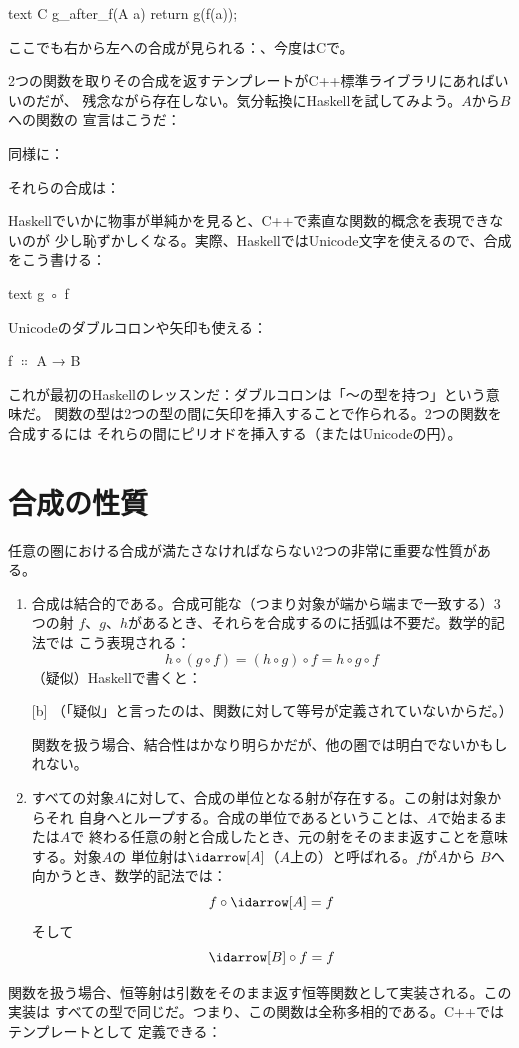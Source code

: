 \begin{snip}{text}
C g_after_f(A a)
{
    return g(f(a));
}
\end{snip}
ここでも右から左への合成が見られる：、今度はCで。

2つの関数を取りその合成を返すテンプレートがC++標準ライブラリにあればいいのだが、
残念ながら存在しない。気分転換にHaskellを試してみよう。$A$から$B$への関数の
宣言はこうだ：

同様に：

それらの合成は：

Haskellでいかに物事が単純かを見ると、C++で素直な関数的概念を表現できないのが
少し恥ずかしくなる。実際、HaskellではUnicode文字を使えるので、合成をこう書ける：
\begin{snip}{text}
g ◦ f
\end{snip}

Unicodeのダブルコロンや矢印も使える：
\begin{snipv}
f \ensuremath{\Colon} A → B
\end{snipv}
これが最初のHaskellのレッスンだ：ダブルコロンは「〜の型を持つ」という意味だ。
関数の型は2つの型の間に矢印を挿入することで作られる。2つの関数を合成するには
それらの間にピリオドを挿入する（またはUnicodeの円）。

\section{合成の性質}

任意の圏における合成が満たさなければならない2つの非常に重要な性質がある。

\begin{enumerate}
  \item
        合成は結合的である。合成可能な（つまり対象が端から端まで一致する）3つの射
        $f$、$g$、$h$があるとき、それらを合成するのに括弧は不要だ。数学的記法では
        こう表現される：
        \[h \circ (g \circ f) = (h \circ g) \circ f = h \circ g \circ f\]
        （疑似）Haskellで書くと：

        [b]
        （「疑似」と言ったのは、関数に対して等号が定義されていないからだ。）

        関数を扱う場合、結合性はかなり明らかだが、他の圏では明白でないかもしれない。

  \item
        すべての対象$A$に対して、合成の単位となる射が存在する。この射は対象からそれ
        自身へとループする。合成の単位であるということは、$A$で始まるまたは$A$で
        終わる任意の射と合成したとき、元の射をそのまま返すことを意味する。対象$A$の
        単位射は$\idarrow[A]$（$A$上の）と呼ばれる。$f$が$A$から
        $B$へ向かうとき、数学的記法では：
        \[f \circ \idarrow[A] = f\]
        そして
        \[\idarrow[B] \circ f = f\]
\end{enumerate}
関数を扱う場合、恒等射は引数をそのまま返す恒等関数として実装される。この実装は
すべての型で同じだ。つまり、この関数は全称多相的である。C++ではテンプレートとして
定義できる：

